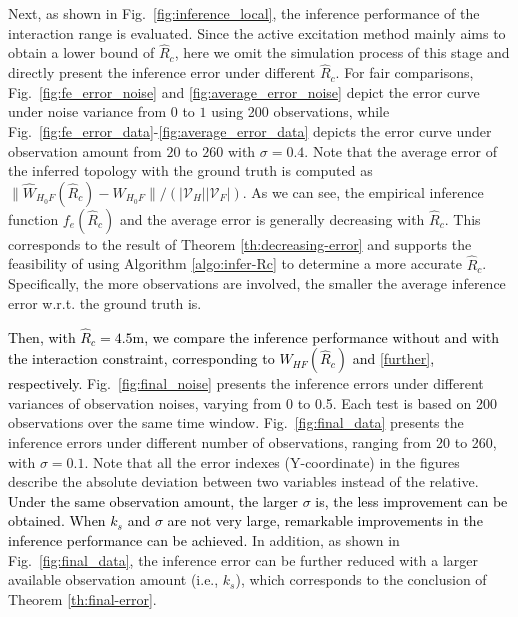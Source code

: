 \documentclass[12pt,journal,draftclsnofoot,onecolumn]{IEEEtran}
\let \sss=\scriptscriptstyle
\begin{document}
Next, as shown in Fig.~\ref{fig:inference_local}, the inference performance of the interaction range is evaluated. 
Since the active excitation method mainly aims to obtain a lower bound of $\hat{R}_c$, here we omit the simulation process of this stage and directly present the inference error under different $\hat{R}_c$. 
For fair comparisons, Fig.~\ref{fig:fe_error_noise} and \ref{fig:average_error_noise} depict the error curve under noise variance from $0$ to $1$ using 200 observations, while Fig.~\ref{fig:fe_error_data}-\ref{fig:average_error_data} depicts the error curve under observation amount from $20$ to $260$ with $\sigma=0.4$. 
Note that the average error of the inferred topology with the ground truth is computed as $ \| \hat W_{\sss{H_0 F}}(\hat{R}_c)  - W_{\sss{H_0 F}} \|/(|\mathcal{V}_{\sss{H}}||\mathcal{V}_{\sss{F}}|)$. 
As we can see, the empirical inference function $f_e(\hat{R}_c)$ and the average error is generally decreasing with $\hat{R}_c$. 
This corresponds to the result of Theorem \ref{th:decreasing-error} and supports the feasibility of using Algorithm \ref{algo:infer-Rc} to determine a more accurate $\hat R_c$. 
Specifically, the more observations are involved, the smaller the average inference error w.r.t. the ground truth is.  




\textcolor{black}{
Then, with $\hat{R}_c=4.5$m, we compare the inference performance without and with the interaction constraint, corresponding to $\hat W_{\sss{HF}}(\hat R_{c})$ and \eqref{further}, respectively. }
Fig.~\ref{fig:final_noise} presents the inference errors under different variances of observation noises, varying from 0 to 0.5. 
Each test is based on 200 observations over the same time window.  
Fig.~\ref{fig:final_data} presents the inference errors under different number of observations, ranging from 20 to 260, with $\sigma=0.1$. 
Note that all the error indexes (Y-coordinate) in the figures describe the absolute deviation between two variables instead of the relative. 
\textcolor{black}{Under the same observation amount, the larger $\sigma$ is, the less improvement can be obtained. 
When $k_s$ and $\sigma$ are not very large, remarkable improvements in the inference performance can be achieved.} 
In addition, as shown in Fig.~\ref{fig:final_data}, the inference error can be further reduced with a larger available observation amount (i.e., $k_{s}$), which corresponds to the conclusion of Theorem \ref{th:final-error}. 
\end{document}
